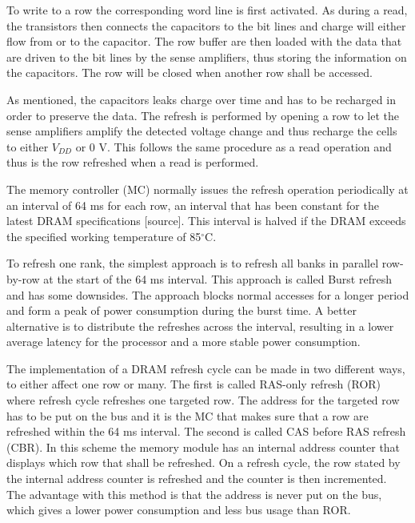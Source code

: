 To write to a row the corresponding word line is first activated. As during a read, the transistors then connects the capacitors to the bit lines and charge will either flow from or to the capacitor. The row buffer are then loaded with the data that are driven to the bit lines by the sense amplifiers, thus storing the information on the capacitors. The row will be closed when another row shall be accessed.

As mentioned, the capacitors leaks charge over time and has to be recharged in order to preserve the data. The refresh is performed by opening a row to let the sense amplifiers amplify the detected voltage change and thus recharge the cells to either \(V_{DD}\) or 0 V. This follows the same procedure as a read operation and thus is the row refreshed when a read is performed. 

The memory controller (MC) normally issues the refresh operation periodically at an interval of 64 ms for each row, an interval that has been constant for the latest DRAM specifications [source]. This interval is halved if the DRAM exceeds the specified working temperature of 85$^{\circ}$C. %

To refresh one rank, the simplest approach is to refresh all banks in parallel row-by-row at the start of the 64 ms interval. This approach is called Burst refresh and has some downsides. The approach blocks normal accesses for a longer period and form a peak of power consumption during the burst time. A better alternative is to distribute the refreshes across the interval, resulting in a lower average latency for the processor and a more stable power consumption.

The implementation of a DRAM refresh cycle can be made in two different ways, to either affect one row or many. The first is called RAS-only refresh (ROR) where refresh cycle refreshes one targeted row. The address for the targeted row has to be put on the bus and it is the MC that makes sure that a row are refreshed within the 64 ms interval. The second is called CAS before RAS refresh (CBR). In this scheme the memory module has an internal address counter that displays which row that shall be refreshed. On a refresh cycle, the row stated by the internal address counter is refreshed and the counter is then incremented. The advantage with this method is that the address is never put on the bus, which gives a lower power consumption and less bus usage than ROR. 

